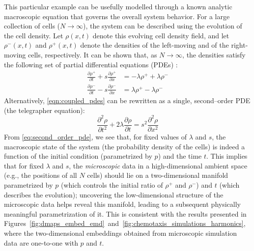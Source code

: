 \documentclass[3p]{elsarticle}
\begin{document}
This particular example can be usefully modelled through a known analytic macroscopic equation that governs the overall system behavior.
%
For a large collection of cells ($N \rightarrow \infty$), the system can be described using the evolution of the cell density.
%
Let $\rho(x, t)$ denote this evolving cell density field, and let $\rho^-(x, t)$ and $\rho^+(x, t)$ denote the 
densities of the left-moving and of the right-moving cells, respectively.
%
It can be shown that, as $N \rightarrow \infty$, the densities satisfy the following set of partial differential equations (PDEs) \cite{othmer2000diffusion}:
\begin{equation} \label{eqn:coupled_pdes}
\begin{aligned}
\frac{\partial \rho^+}{\partial t} + s \frac{\partial \rho^+}{\partial x} & = -\lambda \rho^+ +\lambda \rho^- \\
\frac{\partial \rho^-}{\partial t} - s \frac{\partial \rho^-}{\partial x} & = \lambda \rho^+ -\lambda \rho^-
\end{aligned}
\end{equation}
%
Alternatively, \eqref{eqn:coupled_pdes} can be rewritten as a single, second--order PDE (the telegrapher equation):
\begin{equation} \label{eq:second_order_pde}
\frac{\partial^2 \rho}{\partial t^2} + 2 \lambda \frac{\partial \rho}{\partial t} = s^2 \frac{\partial ^2 \rho}{\partial x^2}
\end{equation}
%
From \eqref{eq:second_order_pde}, we see that, for fixed values of $\lambda$ and $s$, the macroscopic 
state of the system (the probability density of the cells) is indeed a function of the initial condition (parametrized by $p$) and the time $t$.
%
This implies that for fixed $\lambda$ and $s$, the {\em microscopic} data in a high-dimensional ambient space (e.g., the positions of all $N$ cells) should lie on a two-dimensional manifold parametrized by $p$ (which controls the initial ratio of $\rho^+$ and $\rho^-$) and $t$ (which describes the evolution);
uncovering the low-dimensional structure of the microscopic data helps reveal this manifold, leading to a subsequent physically meaningful
parametrization of it.
%
This is consistent with the results presented in Figures~\ref{fig:dmaps_embed_emd}~and~\ref{fig:chemotaxis_simulations_harmonics}, where the two-dimensional embeddings obtained from microscopic simulation data are one-to-one with $p$ and $t$.
\end{document}
